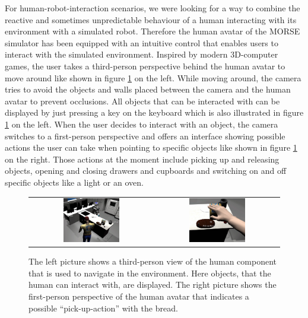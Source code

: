 \documentclass{llncs}
\begin{document}
For human-robot-interaction scenarios, we were looking for a way to combine the reactive and sometimes unpredictable behaviour of a human 
interacting with its environment with a simulated robot. Therefore the human avatar of the MORSE simulator has been equipped with an intuitive 
control that enables users to interact with the simulated environment. Inspired by modern 3D-computer games, the user
takes a third-person perspective behind the human avatar to move around like shown in figure \ref{fig:human_control} on the left. 
While moving around, the camera tries to avoid the objects and walls placed between the camera and the human avatar to prevent occlusions. 
All objects that can be interacted with can be displayed by just pressing a key on the keyboard which is also illustrated in figure 
\ref{fig:human_control} on the left. When the user decides to interact with an object, the camera switches to a first-person perspective 
and offers an interface showing possible actions the user can take when pointing to specific objects like shown in figure \ref{fig:human_control} 
on the right. Those actions at the moment include picking up and releasing objects, opening and closing drawers and cupboards and switching
on and off specific objects like a light or an oven. 

\begin{figure}[h!]
\centering
\begin{tabular}{cc}
 \includegraphics[width=0.475\textwidth]{pics/human_control_1.png} & \includegraphics[width=0.475\textwidth]{pics/human_control_2.png}
\end{tabular}
\caption{The left picture shows a third-person view of the human component that is used to navigate in the environment. Here
objects, that the human can interact with, are displayed. The right picture shows the first-person perspective of the human 
avatar that indicates a possible ``pick-up-action'' with the bread.}
\label{fig:human_control}
\end{figure}
\end{document}

